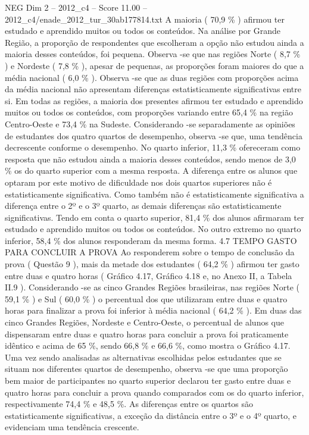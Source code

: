 \begin{textsample}{NEG Dim 2 – 2012\_c4 – Score 11.00 – 2012\_c4/enade\_2012\_tur\_30ab177814.txt}
A maioria ( 70,9 \% ) afirmou ter estudado e aprendido muitos ou todos os conteúdos.
Na análise por Grande Região, a proporção de respondentes que escolheram a opção não estudou ainda a maioria desses conteúdos, foi pequena.
Observa -se que nas regiões Norte ( 8,7 \% ) e Nordeste ( 7,8 \% ), apesar de pequenas, as proporções foram maiores do que a média nacional ( 6,0 \% ).
Observa -se que as duas regiões com proporções acima da média nacional não apresentam diferenças estatisticamente significativas entre si.
Em todas as regiões, a maioria dos presentes afirmou ter estudado e aprendido muitos ou todos os conteúdos, com proporções variando entre 65,4 \% na região Centro-Oeste e 73,4 \% na Sudeste.
Considerando -se separadamente as opiniões de estudantes dos quatro quartos de desempenho, observa -se que, uma tendência decrescente conforme o desempenho.
No quarto inferior, 11,3 \% ofereceram como resposta que não estudou ainda a maioria desses conteúdos, sendo menos de 3,0 \% os do quarto superior com a mesma resposta.
A diferença entre os alunos que optaram por este motivo de dificuldade nos dois quartos superiores não é estatisticamente significativa.
Como também não é estatisticamente significativa a diferença entre o 2º e o 3º quarto, as demais diferenças são estatisticamente significativas.
Tendo em conta o quarto superior, 81,4 \% dos alunos afirmaram ter estudado e aprendido muitos ou todos os conteúdos.
No outro extremo no quarto inferior, 58,4 \% dos alunos responderam da mesma forma. 4.7 TEMPO GASTO PARA CONCLUIR A PROVA Ao responderem sobre o tempo de conclusão da prova ( Questão 9 ), mais da metade dos estudantes ( 64,2 \% ) afirmou ter gasto entre duas e quatro horas ( Gráfico 4.17, Gráfico 4.18 e, no Anexo II, a Tabela II.9 ).
Considerando -se as cinco Grandes Regiões brasileiras, nas regiões Norte ( 59,1 \% ) e Sul ( 60,0 \% ) o percentual dos que utilizaram entre duas e quatro horas para finalizar a prova foi inferior à média nacional ( 64,2 \% ).
Em duas das cinco Grandes Regiões, Nordeste e Centro-Oeste, o percentual de alunos que dispensaram entre duas e quatro horas para concluir a prova foi praticamente idêntico e acima de 65 \%, sendo 66,8 \% e 66,6 \%, como mostra o Gráfico 4.17.
Uma vez sendo analisadas as alternativas escolhidas pelos estudantes que se situam nos diferentes quartos de desempenho, observa -se que uma proporção bem maior de participantes no quarto superior declarou ter gasto entre duas e quatro horas para concluir a prova quando comparados com os do quarto inferior, respectivamente 74,4 \% e 48,5 \%.
As diferenças entre os quartos são estatisticamente significativas, a exceção da distância entre o 3º e o 4º quarto, e evidenciam uma tendência crescente.

\end{textsample}
